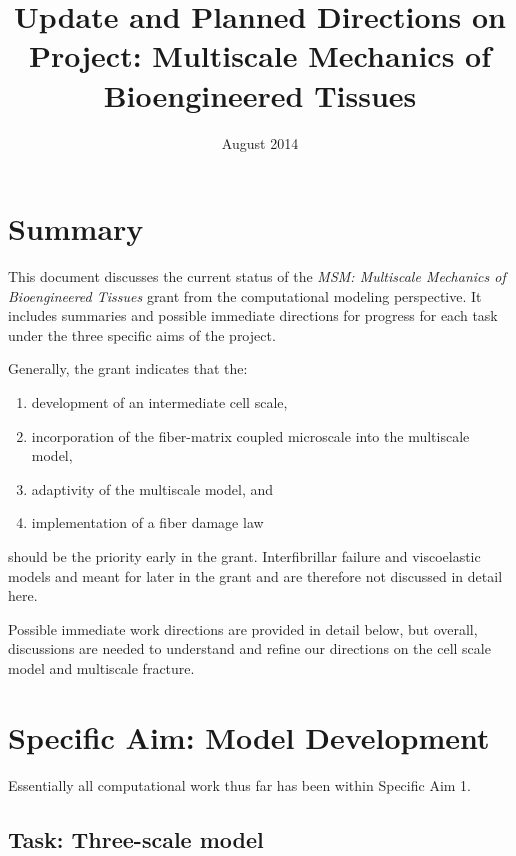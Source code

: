 \documentclass{article}
\begin{document}

\title{Update and Planned Directions on Project: Multiscale Mechanics of Bioengineered Tissues}
\date{August 2014}
\maketitle


\section{Summary}

This document discusses the current status of the \textit{MSM: Multiscale Mechanics of Bioengineered Tissues} grant from the computational modeling perspective. It includes summaries and possible immediate directions for progress for each task under the three specific aims of the project.

Generally, the grant indicates that the:
\begin{enumerate}
\item development of an intermediate cell scale,
\item incorporation of the fiber-matrix coupled microscale into the multiscale model, 
\item adaptivity of the multiscale model, and
\item implementation of a fiber damage law 
\end{enumerate}
should be the priority early in the grant. Interfibrillar failure and viscoelastic models and meant for later in the grant and are therefore not discussed in detail here.

Possible immediate work directions are provided in detail below, but overall, discussions are needed to understand and refine our directions on the cell scale model and multiscale fracture.

\section{Specific Aim: Model Development}

Essentially all computational work thus far has been within Specific Aim 1.

\subsection{Task: Three-scale model}
\end{document}
